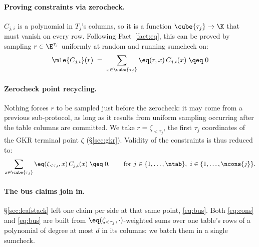 \paragraph{Proving constraints via zerocheck.} $C_{j,i}$ is a polynomial in $T_j$'s columns, so it is a function $\cube{\tau_j}\to\K$ that must vanish on every row. Following Fact~\ref{fact:eq}, this can be proved by sampling $r\in\E^{\tau_j}$ uniformly at random and running sumcheck on:
\[
  \mle{C_{j,i}}(r)\;=\;\sum_{x\in\cube{\tau_j}}\eq(r,x)\,C_{j,i}(x)\;\qeq\;0
\]

\paragraph{Zerocheck point recycling.} Nothing forces $r$ to be sampled just before the zerocheck: it may come from a previous sub-protocol, as long as it results from uniform sampling occurring after the table columns are committed. We take $r=\zeta_{<\tau_j}$, the first $\tau_j$ coordinates of the GKR terminal point $\zeta$ (\S\ref{sec:gkr}). Validity of the constraints is thus reduced to:
\begin{equation}\label{eq:cons}
  \sum_{x\in\cube{\tau_j}}\eq(\zeta_{<\tau_j},x)\,C_{j,i}(x)\;\qeq\;0,
  \qquad \text{for } j\in\{1,\dots,\ntab\},\ i\in\{1,\dots,\ncons{j}\}.
\end{equation}

\paragraph{The bus claims join in.} \S\ref{sec:leafstack} left one claim per side at that same point, \eqref{eq:bus}. Both \eqref{eq:cons} and \eqref{eq:bus} are built from $\eq(\zeta_{<\tau_j},\cdot)$-weighted sums over one table's rows of a polynomial of degree at most $d$ in its columns: we batch them in a single sumcheck.

